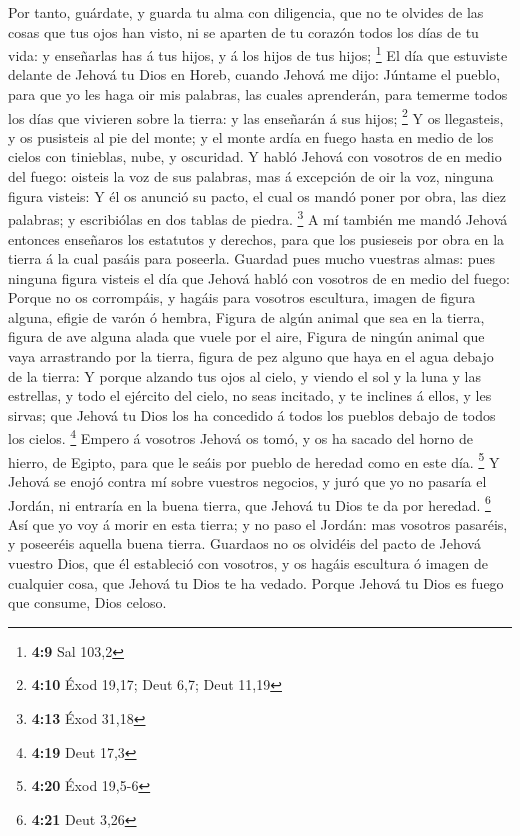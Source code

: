  Por tanto, guárdate, y guarda tu alma con diligencia, que
no te olvides de las cosas que tus ojos han visto, ni se aparten de tu
corazón todos los días de tu vida: y enseñarlas has á tus hijos, y á los
hijos de tus hijos; \footnote{\textbf{4:9} Sal 103,2}  El
día que estuviste delante de Jehová tu Dios en Horeb, cuando Jehová me
dijo: Júntame el pueblo, para que yo les haga oir mis palabras, las
cuales aprenderán, para temerme todos los días que vivieren sobre la
tierra: y las enseñarán á sus hijos; \footnote{\textbf{4:10} Éxod 19,17;
  Deut 6,7; Deut 11,19}  Y os llegasteis, y os pusisteis
al pie del monte; y el monte ardía en fuego hasta en medio de los cielos
con tinieblas, nube, y oscuridad.  Y habló Jehová con
vosotros de en medio del fuego: oisteis la voz de sus palabras, mas á
excepción de oir la voz, ninguna figura visteis:  Y él os
anunció su pacto, el cual os mandó poner por obra, las diez palabras; y
escribiólas en dos tablas de piedra. \footnote{\textbf{4:13} Éxod 31,18}
 A mí también me mandó Jehová entonces enseñaros los
estatutos y derechos, para que los pusieseis por obra en la tierra á la
cual pasáis para poseerla.  Guardad pues mucho vuestras
almas: pues ninguna figura visteis el día que Jehová habló con vosotros
de en medio del fuego:  Porque no os corrompáis, y hagáis
para vosotros escultura, imagen de figura alguna, efigie de varón ó
hembra,  Figura de algún animal que sea en la tierra,
figura de ave alguna alada que vuele por el aire,  Figura
de ningún animal que vaya arrastrando por la tierra, figura de pez
alguno que haya en el agua debajo de la tierra:  Y porque
alzando tus ojos al cielo, y viendo el sol y la luna y las estrellas, y
todo el ejército del cielo, no seas incitado, y te inclines á ellos, y
les sirvas; que Jehová tu Dios los ha concedido á todos los pueblos
debajo de todos los cielos. \footnote{\textbf{4:19} Deut 17,3}
 Empero á vosotros Jehová os tomó, y os ha sacado del
horno de hierro, de Egipto, para que le seáis por pueblo de heredad como
en este día. \footnote{\textbf{4:20} Éxod 19,5-6}  Y
Jehová se enojó contra mí sobre vuestros negocios, y juró que yo no
pasaría el Jordán, ni entraría en la buena tierra, que Jehová tu Dios te
da por heredad. \footnote{\textbf{4:21} Deut 3,26}  Así
que yo voy á morir en esta tierra; y no paso el Jordán: mas vosotros
pasaréis, y poseeréis aquella buena tierra.  Guardaos no
os olvidéis del pacto de Jehová vuestro Dios, que él estableció con
vosotros, y os hagáis escultura ó imagen de cualquier cosa, que Jehová
tu Dios te ha vedado.  Porque Jehová tu Dios es fuego que
consume, Dios celoso.

